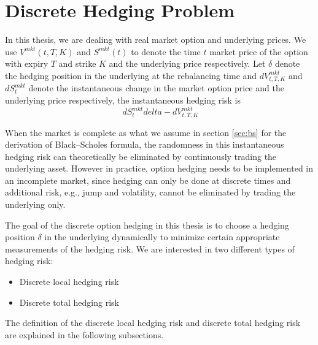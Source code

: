 \documentclass[letterpaper,12pt,titlepage,oneside,final]{book}
\numberwithin{equation}{section}
\theoremstyle{definition}
\newcommand{\Vmkt}{V^{mkt}}
\newcommand{\Smkt}{S^{mkt}}
\begin{document}
\section{Discrete Hedging Problem}
In this thesis, we are dealing with real market option and underlying prices.  We use  $\Vmkt(t,T,K)$ and $\Smkt(t)$ to denote the time $t$ market price of the option with expiry $T$ and strike $K$ and the underlying price respectively. 
Let  $\delta$ denote the hedging position in the underlying at the rebalancing time and
$d\Vmkt_{t,T,K}$ and $d\Smkt_{t}$ denote the instantaneous change in the market option price and the underlying price respectively, the instantaneous hedging
risk is
\begin{equation}\label{HE}
    \ d\Smkt_{t} delta-d \Vmkt_{t,T,K}
\end{equation}

When the market is complete as what we assume in section \ref{sec:bs} for the derivation of Black–Scholes formula, the randomness in this instantaneous hedging risk can theoretically be eliminated by continuously trading the underlying asset. However in practice, option hedging needs to be implemented in an incomplete market, since hedging can only be done at discrete times and additional risk, e.g., jump and volatility, cannot be eliminated by trading the underlying only. 

The goal of the discrete option hedging in this thesis is to choose a hedging position $\delta$ in the underlying dynamically to minimize certain appropriate measurements of the hedging risk. We are interested in two different types of hedging risk:
\begin{itemize}
   \item  Discrete local hedging risk
   \item  Discrete total hedging risk
\end{itemize}
The definition of the discrete local hedging risk and discrete total hedging risk are explained in the following subsections.
\end{document}
